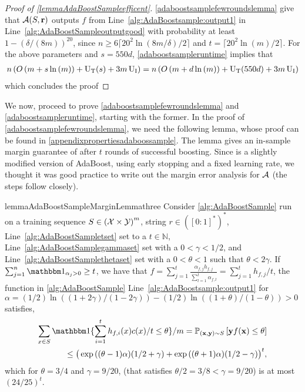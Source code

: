 \begin{proof}[Proof of \cref{lemmaAdaBoostSampleefficent}]
     \cref{adaboostsamplefewroundslemma} give that $\mathcal{A}(S,\mathbf{r})$  outputs $f$ from Line~\ref{alg:AdaBoostsample:output1} in Line~\ref{alg:AdaBoostSampleoutputgood} with probability at least $1-(\delta/(8m))^{20}$, since $ n\geq 6\lceil20^{2}\ln{(8m/\delta )}/2\rceil $ and $ t=\lceil 20^{2}\ln{(m )}/2\rceil $. For the above parameters and $ s=550d $, \cref{adaboostsampleruntime} implies that
    \begin{align*}
      n\left(O\left(m+s\ln{\left(m \right)}\right)+\operatorname{U_{T}}(s)+3m\operatorname{U_{I}}\right)= n\left(O\left(m+d\ln{\left(m \right)}\right)+\operatorname{U_{T}}(550d)+3m\operatorname{U_{I}}\right)
       \end{align*}
which concludes the proof
\end{proof}
We now, proceed to prove \cref{adaboostsamplefewroundslemma} and \cref{adaboostsampleruntime}, starting with the former. In the proof of \cref{adaboostsamplefewroundslemma}, we need the following lemma, whose proof can be found in \cref{appendixpropertiesadaboossample}. The lemma gives an in-sample margin guarantee of \as after $ t $ rounds of successful boosting. Since \as is a slightly modified version of AdaBoost, using early stopping and a fixed learning rate, we thought it was good practice to write out the margin error analysis for $ \mathcal{A} $ (the steps follow \cite{boostingbookSchapireF12} closely).  

\begin{restatable}{lemma}{AdaBoostSampleMarginLemmathree}\label{AdaBoostSampleMarginLemma3}
Consider \cref{alg:AdaBoostSample} run on a training sequence $S\in\left(\mathcal{X}\times\mathcal{Y}\right)^{m}$, string $r\in([0:1]^{*})^{*}$, Line~\ref{alg:AdaBoostSampletset} set to a $t\in\mathbb{N}$, Line~\ref{alg:AdaBoostSamplegammaset} set with a $0< \gamma< 1/2$, and Line~\ref{alg:AdaBoostSamplethetaset} set with a $0<\theta <1$ such that $\theta<2\gamma$. If $\sum_{j=1}^{n}\ind_{\alpha_j>0}\geq t$, we have that $f=\sum_{j=1}^{t} \frac{\alpha_{f,j}h_{f,j}}{\sum_{l=1}^{t}{\alpha_{f,l}}}=\sum_{j=1}^{t} h_{f,j}/t$, the function in \cref{alg:AdaBoostSample} Line~\ref{alg:AdaBoostsample:output1} for $ \alpha=(1/2)\ln{\left((1+2\gamma)/(1-2\gamma)\right)- (1/2)\ln{\left((1+\theta)/(1-\theta) \right)}}>0 $  satisfies,
\begin{align*}
  \sum_{x\in S} \ind\{\sum_{i=1}^{t} h_{f,i}(x)c(x)/t\leq \theta \}/m  =\p_{(\rx,\ry)\sim S}\left[\ry f(\rx)\leq \theta \right]\\\leq \big(\exp{((\theta-1)\alpha)}(1/2+\gamma)+\exp{((\theta+1)\alpha)}(1/2-\gamma)\big)^{t},
\end{align*}
which for $ \theta=3/4 $ and $ \gamma=9/20 $, (that satisfies $ \theta/2 =3/8 <\gamma=9/20 $) is at most $ (24/25)^{t} $.  
\end{restatable}

